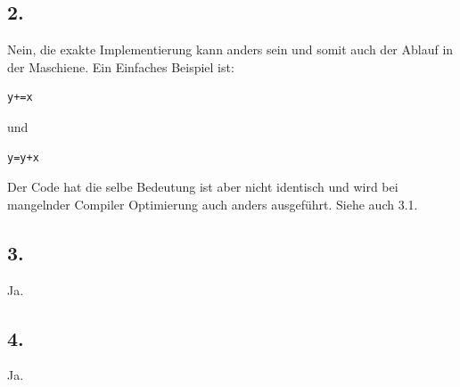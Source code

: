 \documentclass[a4paper]{report}
\begin{document}
\subsection*{2.}
Nein, die exakte Implementierung kann anders sein und somit auch der Ablauf in der Maschiene. Ein Einfaches Beispiel ist:
\begin{lstlisting}
y+=x
\end{lstlisting}
und
\begin{lstlisting}
y=y+x
\end{lstlisting}
Der Code hat die selbe Bedeutung ist aber nicht identisch und wird bei mangelnder Compiler Optimierung auch anders ausgeführt. Siehe auch 3.1.
\subsection*{3.}
Ja.
\subsection*{4.}
Ja.
\end{document}
